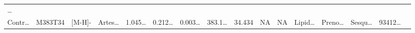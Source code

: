 \documentclass[
]{article}
\begin{document}
\begin{longtable}[]{@{}llllllllllllllll@{}}
\begin{minipage}[t]{0.02\columnwidth}
\ldots{}\strut
\end{minipage}\tabularnewline
\begin{minipage}[t]{0.04\columnwidth}\raggedright
Contr\ldots{}\strut
\end{minipage} & \begin{minipage}[t]{0.04\columnwidth}\raggedright
M383T34\strut
\end{minipage} & \begin{minipage}[t]{0.04\columnwidth}\raggedright
{[}M-H{]}-\strut
\end{minipage} & \begin{minipage}[t]{0.04\columnwidth}\raggedright
Artes\ldots{}\strut
\end{minipage} & \begin{minipage}[t]{0.04\columnwidth}\raggedright
1.045\ldots{}\strut
\end{minipage} & \begin{minipage}[t]{0.04\columnwidth}\raggedright
0.212\ldots{}\strut
\end{minipage} & \begin{minipage}[t]{0.04\columnwidth}\raggedright
0.003\ldots{}\strut
\end{minipage} & \begin{minipage}[t]{0.04\columnwidth}\raggedright
383.1\ldots{}\strut
\end{minipage} & \begin{minipage}[t]{0.04\columnwidth}\raggedright
34.434\strut
\end{minipage} & \begin{minipage}[t]{0.04\columnwidth}\raggedright
NA\strut
\end{minipage} & \begin{minipage}[t]{0.03\columnwidth}\raggedright
NA\strut
\end{minipage} & \begin{minipage}[t]{0.04\columnwidth}\raggedright
Lipid\ldots{}\strut
\end{minipage} & \begin{minipage}[t]{0.04\columnwidth}\raggedright
Preno\ldots{}\strut
\end{minipage} & \begin{minipage}[t]{0.04\columnwidth}\raggedright
Sesqu\ldots{}\strut
\end{minipage} & \begin{minipage}[t]{0.04\columnwidth}\raggedright
93412\ldots{}\strut
\end{minipage} & \begin{minipage}[t]{0.02\columnwidth}\raggedright

\end{minipage}
\end{longtable}
\end{document}
